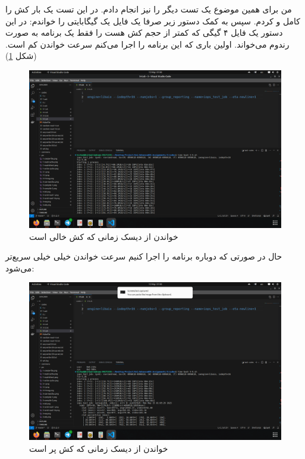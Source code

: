 من برای همین موضوع یک تست دیگر را نیز انجام دادم. در این تست یک بار کش را کامل
 و 
کردم. سپس به کمک دستور زیر صرفا یک فایل یک گیگابایتی را خواندم:
در این دستور یک فایل ۴ گیگی که کمتر از حجم کش هست را فقط یک برنامه به صورت رندوم می‌خواند.
اولین باری که این برنامه را اجرا می‌کنم سرعت خواندن کم است.
(شکل \ref{fig:cold-cache})
\begin{figure}[H]
    \centering
    \includegraphics[scale=0.25]{pic/3-cold-cache.png}
    \caption{خواندن از دیسک زمانی که کش خالی است}
    \label{fig:cold-cache}
\end{figure}
حال در صورتی که دوباره برنامه را اجرا کنیم سرعت خواندن خیلی خیلی سریع‌تر می‌شود:
\begin{figure}[H]
    \centering
    \includegraphics[scale=0.25]{pic/3-warm-cache.png}
    \caption{خواندن از دیسک زمانی که کش پر است}
    \label{fig:warm-cache}
\end{figure}